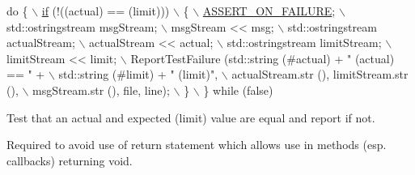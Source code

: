 \begin{DoxyCode}
\textcolor{keywordflow}{do} \{                                                                  \hyperlink{loss__ITU1238_8m_a419d895abe1313c35fa353c93802647e}{\(\backslash\)}
\hyperlink{loss__ITU1238_8m_a419d895abe1313c35fa353c93802647e}{    if} (!((actual) == (limit)))                                         \(\backslash\)
      \{                                                                 \hyperlink{group__testing_ga044d7c8c214fe3761af96ee3cbe2edc3}{\(\backslash\)}
\hyperlink{group__testing_ga044d7c8c214fe3761af96ee3cbe2edc3}{        ASSERT\_ON\_FAILURE};                                              \(\backslash\)
        std::ostringstream msgStream;                                   \(\backslash\)
        msgStream << msg;                                               \(\backslash\)
        std::ostringstream actualStream;                                \(\backslash\)
        actualStream << actual;                                         \(\backslash\)
        std::ostringstream limitStream;                                 \(\backslash\)
        limitStream << limit;                                           \(\backslash\)
        ReportTestFailure (std::string (#actual) + \textcolor{stringliteral}{" (actual) == "} +    \(\backslash\)
                       std::string (#limit) + \textcolor{stringliteral}{" (limit)"},               \(\backslash\)
                       actualStream.str (), limitStream.str (),         \(\backslash\)
                       msgStream.str (), file, line);                   \(\backslash\)
      \}                                                                 \(\backslash\)
  \} \textcolor{keywordflow}{while} (\textcolor{keyword}{false})
\end{DoxyCode}


Test that an actual and expected (limit) value are equal and report if not. 

Required to avoid use of return statement which allows use in methods (esp. callbacks) returning void. 
